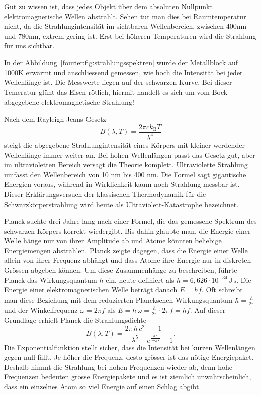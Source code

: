 	Gut zu wissen ist, dass jedes Objekt über dem absoluten Nullpunkt elektromagnetische Wellen abstrahlt. 
	Sehen tut man dies bei Raumtemperatur nicht, da die Strahlungintensität im sichtbaren Wellenbereich, zwischen 400nm und 780nm, extrem gering ist. 
	Erst bei höheren Temperaturen wird die Strahlung für uns sichtbar. 
	
	
	
	In der Abbildung~\ref{fourier:fig:strahlungsspektren} wurde der Metallblock auf 1000K erwärmt und anschliessend gemessen, wie hoch die Intensität bei jeder Wellenlänge ist. 
	Die Messwerte liegen auf der schwarzen Kurve.
	Bei dieser Temeratur glüht das Eisen rötlich, hiermit handelt es sich um vom Bock abgegebene elektromagnetische Strahlung!
	
	
	Nach dem Rayleigh-Jeans-Gesetz 
	\begin{equation}
		B(\lambda, T) = \frac{2 \pi c k_\mathrm{B} T}{\lambda^4}
	\end{equation}
	steigt die abgegebene Strahlungintensität eines Körpers mit kleiner werdender Wellenlänge immer weiter an. 
	Bei hohen Wellenlängen passt das Gesetz gut, aber im ultravioletten Bereich versagt die Theorie komplett. Ultraviolette Strahlung umfasst den Wellenbereich von 10 nm bis 400 nm. 
	Die Formel sagt gigantische Energien voraus, während in Wirklichkeit kaum noch Strahlung messbar ist. 
	Dieser Erklärungsversuch der klassischen Thermodynamik für die Schwarzkörperstrahlung wird heute als Ultraviolett-Katastrophe bezeichnet. 
	
	
	
	Planck suchte drei Jahre lang nach einer Formel, die das gemessene Spektrum des schwarzen Körpers korrekt wiedergibt.  
	Bis dahin glaubte man, die Energie einer Welle hänge nur von ihrer Amplitude ab und Atome könnten beliebige Energiemengen abstrahlen.  
	Planck zeigte dagegen, dass die Energie einer Welle allein von ihrer Frequenz abhängt und dass Atome ihre Energie nur in diskreten Grössen abgeben können.  
	Um diese Zusammenhänge zu beschreiben, führte Planck das Wirkungsquantum $h$ ein, heute definiert als  
	$
	h = 6{,}626\cdot10^{-34}\,\mathrm{J\,s}.
	$
	Die Energie einer elektromagnetischen Welle beträgt danach $E = hf$.  
	Oft schreibt man diese Beziehung mit dem reduzierten Planckschen Wirkungsquantum $\hbar = \tfrac{h}{2\pi}$ und der Winkelfrequenz $\omega = 2\pi f$ als  
	$
	E = \hbar\,\omega = \frac{h}{2\pi}\cdot2\pi f = h f.
	$
	Auf dieser Grundlage erhielt Planck die Strahlungsdichte  
	\begin{equation}
		B(\lambda,T)
		= \frac{2\pi\,h\,c^2}{\lambda^5}\,\frac{1}{e^{\frac{h\,c}{\lambda\,k_B\,T}} - 1}.
	\end{equation}
	Die Exponentialfunktion stellt sicher, dass die Intensität bei kurzen Wellenlängen gegen null fällt. 
	Je höher die Frequenz, desto grösser ist das nötige Energiepaket. 
	Deshalb nimmt die Strahlung bei hohen Frequenzen wieder ab, denn hohe Frequenzen bedeuten grosse Energiepakete und es ist ziemlich unwahrscheinlich, dass ein einzelnes Atom so viel Energie auf einen Schlag abgibt. 

